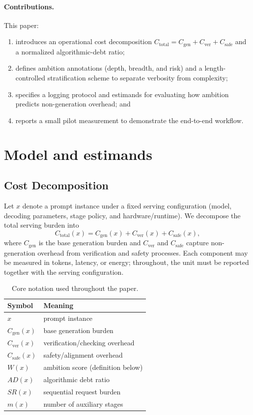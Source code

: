 \documentclass{svjour3}
\begin{document}
\paragraph{Contributions.} This paper:
\begin{enumerate}[leftmargin=*]
\item introduces an operational cost decomposition $C_{\text{total}}=C_{\text{gen}}+C_{\text{ver}}+C_{\text{safe}}$ and a normalized algorithmic-debt ratio;
\item defines ambition annotations (depth, breadth, and risk) and a length-controlled stratification scheme to separate verbosity from complexity;
\item specifies a logging protocol and estimands for evaluating how ambition predicts non-generation overhead; and
\item reports a small pilot measurement to demonstrate the end-to-end workflow.
\end{enumerate}

\section{Model and estimands}
\subsection{Cost Decomposition}
Let $x$ denote a prompt instance under a fixed serving configuration (model, decoding parameters, stage policy, and hardware/runtime). We decompose the total serving burden into
\[
C_{\text{total}}(x)=C_{\text{gen}}(x)+C_{\text{ver}}(x)+C_{\text{safe}}(x),
\]
where $C_{\text{gen}}$ is the base generation burden and $C_{\text{ver}}$ and $C_{\text{safe}}$ capture non-generation overhead from verification and safety processes. Each component may be measured in tokens, latency, or energy; throughout, the unit must be reported together with the serving configuration.

\begin{table}[t]
\caption{Core notation used throughout the paper.}
\label{tab:notation}
\centering
\begin{tabular}{ll}
\toprule
Symbol & Meaning \\
\midrule
$x$ & prompt instance \\
$C_{\text{gen}}(x)$ & base generation burden \\
$C_{\text{ver}}(x)$ & verification/checking overhead \\
$C_{\text{safe}}(x)$ & safety/alignment overhead \\
$W(x)$ & ambition score (definition below) \\
$AD(x)$ & algorithmic debt ratio \\
$SR(x)$ & sequential request burden \\
$m(x)$ & number of auxiliary stages \\
\bottomrule
\end{tabular}
\end{table}
\end{document}
